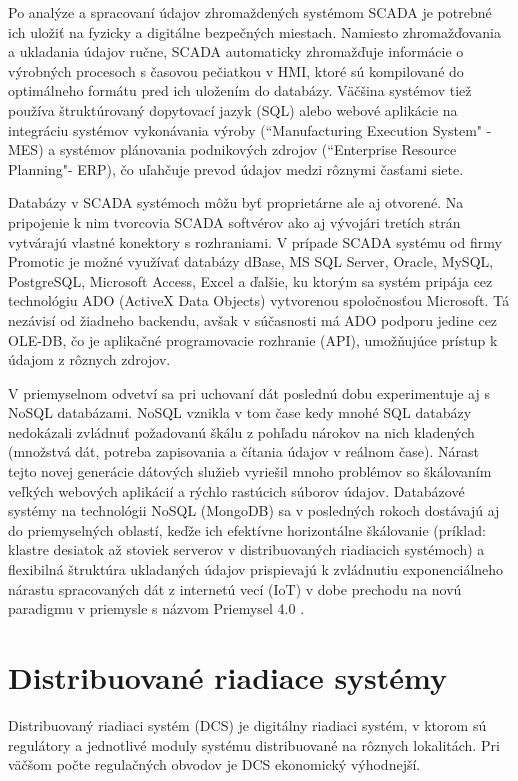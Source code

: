\documentclass[]{tukediphc}
\begin{document}
Po analýze a spracovaní údajov zhromaždených systémom SCADA je potrebné ich uložiť na fyzicky a digitálne bezpečných miestach. Namiesto zhromažďovania a ukladania údajov ručne, SCADA automaticky zhromažďuje informácie o výrobných procesoch s časovou pečiatkou v HMI, ktoré sú kompilované do optimálneho formátu pred ich uložením do databázy. Väčšina systémov tiež používa štruktúrovaný dopytovací jazyk (SQL) alebo webové aplikácie na integráciu systémov vykonávania výroby (``Manufacturing Execution System" - MES) a systémov plánovania podnikových zdrojov (``Enterprise Resource Planning"- ERP), čo uľahčuje prevod údajov medzi rôznymi časťami siete.

Databázy v SCADA systémoch môžu byť proprietárne ale aj otvorené. Na pripojenie k nim tvorcovia SCADA softvérov ako aj vývojári tretích strán vytvárajú vlastné konektory s rozhraniami. V prípade SCADA systému od firmy Promotic je možné využívať databázy dBase, MS SQL Server, Oracle, MySQL, PostgreSQL, Microsoft Access, Excel a ďalšie, ku ktorým sa systém pripája cez technológiu ADO (ActiveX Data Objects) vytvorenou spoločnosťou Microsoft. Tá nezávisí od žiadneho backendu, avšak v súčasnosti má ADO podporu jedine cez OLE-DB, čo je aplikačné programovacie rozhranie (API), umožňujúce prístup k údajom z rôznych zdrojov.

V priemyselnom odvetví sa pri uchovaní dát poslednú dobu experimentuje aj s NoSQL databázami. NoSQL vznikla v tom čase kedy mnohé SQL databázy nedokázali zvládnuť požadovanú škálu z pohľadu nárokov na nich kladených (množstvá dát, potreba zapisovania a čítania údajov v reálnom čase). Nárast tejto novej generácie dátových služieb vyriešil mnoho problémov so škálovaním veľkých webových aplikácií a rýchlo rastúcich súborov údajov. Databázové systémy na technológii NoSQL (MongoDB) sa v posledných rokoch dostávajú aj do priemyselných oblastí, keďže ich efektívne horizontálne škálovanie (príklad: klastre desiatok až stoviek serverov v distribuovaných riadiacich systémoch) a flexibilná štruktúra ukladaných údajov prispievajú k zvládnutiu exponenciálneho nárastu spracovaných dát z internetú vecí (IoT) v dobe prechodu na novú paradigmu v priemysle s názvom Priemysel 4.0 \citep{Klingenmeier2014}.

\section{Distribuované riadiace systémy}

Distribuovaný riadiaci systém (DCS) je digitálny riadiaci systém, v ktorom sú regulátory a jednotlivé moduly systému distribuované na rôznych lokalitách. Pri väčšom počte regulačných obvodov je DCS ekonomický výhodnejší.
\end{document}
